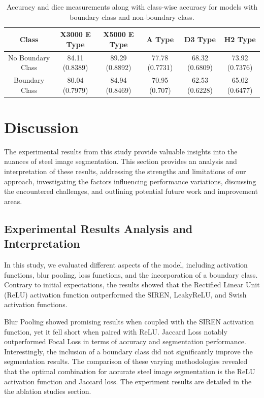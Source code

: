 \documentclass[]{article}
\begin{document}
\begin{table}[h!]
	\centering
	\begin{tabular}{|c|c|c|c|c|c|}
		\hline
		Class & X3000 E Type & X5000 E Type & A Type & D3 Type & H2 Type \\
		\hline
		\rowcolor{yellow!30} No Boundary Class & 84.11 (0.8389) & 89.29 (0.8892) & 77.78 (0.7731) & 68.32 (0.6809) & 73.92 (0.7376) \\
		Boundary Class & 80.04 (0.7979) & 84.94 (0.8469) & 70.95 (0.707) & 62.53 (0.6228) & 65.02 (0.6477) \\
		\hline
	\end{tabular}
	\caption{Accuracy and dice measurements along with class-wise accuracy for models with boundary class and non-boundary class.}
\end{table}



\section{Discussion}

The experimental results from this study provide valuable insights into the nuances of steel image segmentation. This section provides an analysis and interpretation of these results, addressing the strengths and limitations of our approach, investigating the factors influencing performance variations, discussing the encountered challenges, and outlining potential future work and improvement areas.

\subsection{Experimental Results Analysis and Interpretation}

In this study, we evaluated different aspects of the model, including activation functions, blur pooling, loss functions, and the incorporation of a boundary class. Contrary to initial expectations, the results showed that the Rectified Linear Unit (ReLU) activation function outperformed the SIREN, LeakyReLU, and Swish activation functions. 

Blur Pooling showed promising results when coupled with the SIREN activation function, yet it fell short when paired with ReLU. Jaccard Loss notably outperformed Focal Loss in terms of accuracy and segmentation performance. Interestingly, the inclusion of a boundary class did not significantly improve the segmentation results. The comparison of these varying methodologies revealed that the optimal combination for accurate steel image segmentation is the ReLU activation function and Jaccard loss. The experiment results are detailed in the the ablation studies section.
\end{document}
